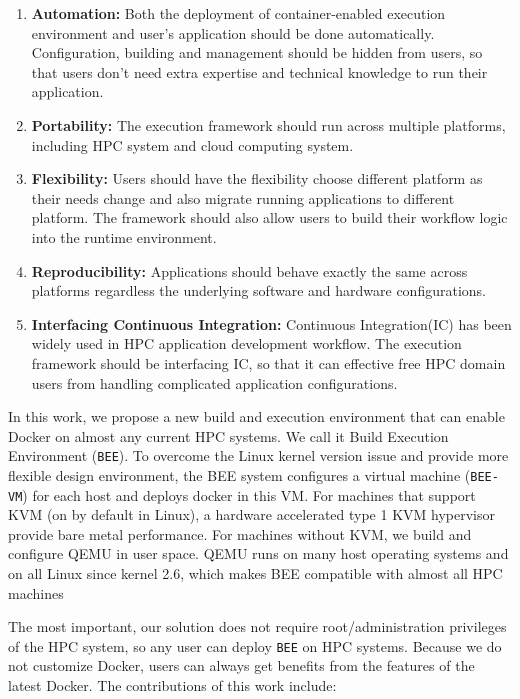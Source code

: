 \begin{enumerate}
\item \textbf{Automation:} 
Both the deployment of container-enabled execution environment and user's application should be done automatically. Configuration, building and management should be hidden from users, so that users don't need extra expertise and technical knowledge to run their application. 
\item \textbf{Portability:}
The execution framework should run across multiple platforms, including HPC system and cloud computing system.
\item \textbf{Flexibility:}
Users should have the flexibility choose different platform as their needs change and also migrate running applications to different platform. The framework should also allow users to build their workflow logic into the runtime environment.
\item \textbf{Reproducibility:}
Applications should behave exactly the same across platforms regardless the underlying software and hardware configurations.
\item \textbf{Interfacing Continuous Integration:}
Continuous Integration(IC) has been widely used in HPC application development workflow. The execution framework should be interfacing IC, so that it can effective free HPC domain users from handling complicated application configurations.  
\end{enumerate}

In this work, we propose a new build and execution environment that can enable Docker on almost any current HPC systems. We call it Build Execution Environment (\texttt{BEE}). To overcome the Linux kernel version issue and provide more flexible design environment, the BEE system configures a virtual machine (\texttt{BEE-VM}) for each host and deploys docker in this VM.  For machines that support KVM (on by default in Linux), a hardware accelerated type 1 KVM hypervisor provide bare metal performance.  For machines without KVM, we build and configure QEMU in user space. QEMU runs on many host operating systems and on all Linux since kernel 2.6, which makes BEE compatible with almost all HPC machines

The most important, our solution does not require root/administration privileges of the HPC system, so any user can deploy \texttt{BEE} on HPC systems. Because we do not customize Docker, users can always get benefits from the features of the latest Docker. The contributions of this work include:


